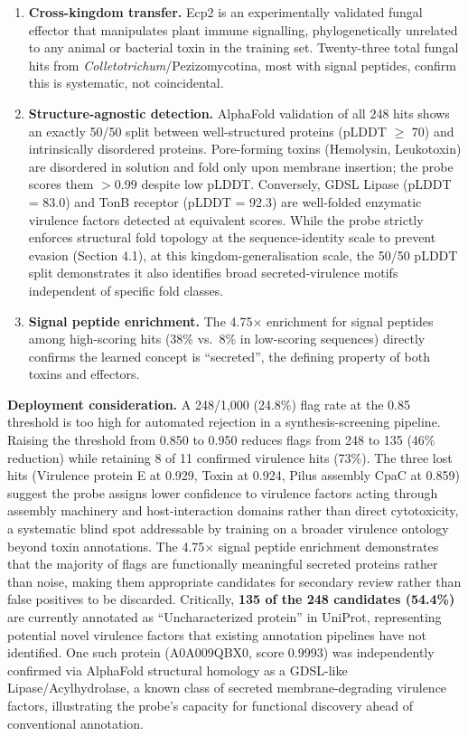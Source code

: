 \documentclass[11pt,a4paper]{article}
\begin{document}
\begin{enumerate}
    \item \textbf{Cross-kingdom transfer.} Ecp2 is an experimentally validated fungal effector
    that manipulates plant immune signalling, phylogenetically unrelated to any animal or
    bacterial toxin in the training set. Twenty-three total fungal hits from
    \textit{Colletotrichum}/Pezizomycotina, most with signal peptides, confirm this is systematic,
    not coincidental.

    \item \textbf{Structure-agnostic detection.} AlphaFold validation of all 248 hits shows
    an exactly 50/50 split between well-structured proteins (pLDDT $\geq$ 70) and intrinsically
    disordered proteins. Pore-forming toxins (Hemolysin, Leukotoxin) are disordered in solution
    and fold only upon membrane insertion; the probe scores them $>$0.99 despite low pLDDT.
    Conversely, GDSL Lipase (pLDDT = 83.0) and TonB receptor (pLDDT = 92.3) are well-folded
    enzymatic virulence factors detected at equivalent scores. While the probe strictly enforces structural fold topology at the sequence-identity scale to prevent evasion (Section 4.1), at this kingdom-generalisation scale, the 50/50 pLDDT split demonstrates it also identifies broad secreted-virulence motifs independent of specific fold classes.

    \item \textbf{Signal peptide enrichment.} The 4.75$\times$ enrichment for signal peptides
    among high-scoring hits (38\% vs.\ 8\% in low-scoring sequences) directly confirms the
    learned concept is ``secreted'', the defining property of both toxins and effectors.
\end{enumerate}

\noindent\textbf{Deployment consideration.} A 248/1,000 (24.8\%) flag rate at the 0.85
threshold is too high for automated rejection in a synthesis-screening pipeline.
Raising the threshold from 0.850 to 0.950 reduces flags from 248 to 135 (46\%
reduction) while retaining 8 of 11 confirmed virulence hits (73\%). The three
lost hits (Virulence protein E at 0.929, Toxin at 0.924, Pilus assembly CpaC
at 0.859) suggest the probe assigns lower confidence to virulence factors acting
through assembly machinery and host-interaction domains rather than direct
cytotoxicity, a systematic blind spot addressable by training on a broader
virulence ontology beyond toxin annotations. The 4.75$\times$ signal peptide
enrichment demonstrates that the majority of flags are functionally meaningful
secreted proteins rather than noise, making them appropriate candidates for
secondary review rather than false positives to be discarded. Critically,
\textbf{135 of the 248 candidates (54.4\%)} are currently annotated as
``Uncharacterized protein'' in UniProt, representing potential novel virulence
factors that existing annotation pipelines have not identified. One such protein
(A0A009QBX0, score 0.9993) was independently confirmed via AlphaFold structural
homology as a GDSL-like Lipase/Acylhydrolase, a known class of secreted
membrane-degrading virulence factors, illustrating the probe's capacity for
functional discovery ahead of conventional annotation.
\end{document}
